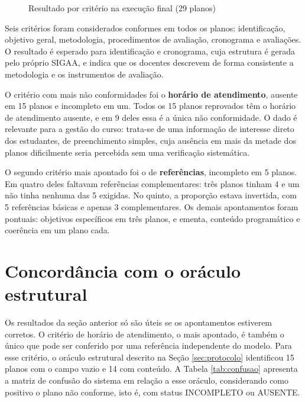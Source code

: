 \begin{figure}[htbp]
\centering
\caption{Resultado por critério na execução final (29 planos)}
\label{fig:criterios}

\end{figure}

Seis critérios foram considerados conformes em todos os planos: identificação, objetivo geral, metodologia, procedimentos de avaliação, cronograma e avaliações. O resultado é esperado para identificação e cronograma, cuja estrutura é gerada pelo próprio SIGAA, e indica que os docentes descrevem de forma consistente a metodologia e os instrumentos de avaliação.

O critério com mais não conformidades foi o \textbf{horário de atendimento}, ausente em 15 planos e incompleto em um. Todos os 15 planos reprovados têm o horário de atendimento ausente, e em 9 deles essa é a única não conformidade. O dado é relevante para a gestão do curso: trata-se de uma informação de interesse direto dos estudantes, de preenchimento simples, cuja ausência em mais da metade dos planos dificilmente seria percebida sem uma verificação sistemática.

O segundo critério mais apontado foi o de \textbf{referências}, incompleto em 5 planos. Em quatro deles faltavam referências complementares: três planos tinham 4 e um não tinha nenhuma das 5 exigidas. No quinto, a proporção estava invertida, com 5 referências básicas e apenas 3 complementares. Os demais apontamentos foram pontuais: objetivos específicos em três planos, e ementa, conteúdo programático e coerência em um plano cada.

\section{Concordância com o oráculo estrutural}
\label{sec:res-oraculo}

Os resultados da seção anterior só são úteis se os apontamentos estiverem corretos. O critério de horário de atendimento, o mais apontado, é também o único que pode ser conferido por uma referência independente do modelo. Para esse critério, o oráculo estrutural descrito na Seção \ref{sec:protocolo} identificou 15 planos com o campo vazio e 14 com conteúdo. A Tabela \ref{tab:confusao} apresenta a matriz de confusão do sistema em relação a esse oráculo, considerando como positivo o plano não conforme, isto é, com status INCOMPLETO ou AUSENTE.

